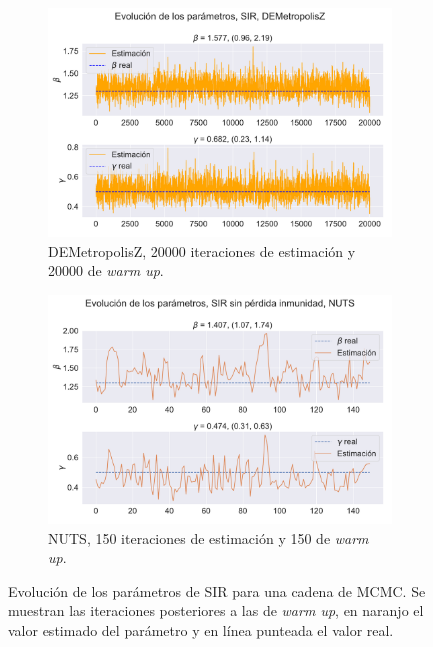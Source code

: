 \begin{figure}[h]
    \centering
    \begin{subfigure}[b]{0.49\linewidth}
        \centering \includegraphics[height=0.65\linewidth]{img/content/chapter4/DEMetropolis_sir_params_trace.pdf}
        \caption{DEMetropolisZ, 20000 iteraciones de estimación y 20000 de \textit{warm up}.}
        \label{fig:DEMetropolis_sir_rec_params_trace}
    \end{subfigure}
    \begin{subfigure}[b]{0.49\linewidth}
        \centering \includegraphics[height=0.65\linewidth]{img/content/chapter4/NUTS_sir_params_trace.pdf}
        \caption{NUTS, 150 iteraciones de estimación y 150 de \textit{warm up}.}
        \label{fig:NUTS_sir_params_trace}
    \end{subfigure}
    \caption{Evolución de los parámetros de SIR para una cadena de MCMC. Se muestran las iteraciones posteriores a las de \textit{warm up}, en naranjo el valor estimado del parámetro y en línea punteada el valor real.}
    \label{fig:MCMC_sir_params_trace}
\end{figure}


